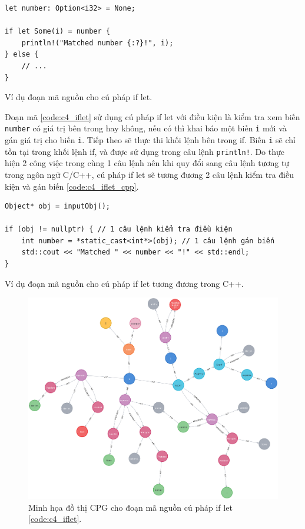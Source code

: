 \begin{listing}[H]
\begin{verbatim}
let number: Option<i32> = None;

if let Some(i) = number {
    println!("Matched number {:?}!", i);
} else {
    // ...
}
\end{verbatim}
\caption{Ví dụ đoạn mã nguồn cho cú pháp if let.}
\label{code:c4_iflet}
\end{listing}

Đoạn mã \ref{code:c4_iflet} sử dụng cú pháp if let với điều kiện là kiểm tra xem biến \texttt{number} có giá trị bên trong hay không, nếu có thì khai báo một biến \texttt{i} mới và gán giá trị cho biến \texttt{i}.
Tiếp theo sẽ thực thi khối lệnh bên trong if.
Biến \texttt{i} sẽ chỉ tồn tại trong khối lệnh if, và được sử dụng trong câu lệnh \texttt{println!}.
Do thực hiện 2 công việc trong cùng 1 câu lệnh nên khi quy đổi sang câu lệnh tương tự trong ngôn ngữ C/C++, cú pháp if let sẽ tương đương 2 câu lệnh kiểm tra điều kiện và gán biến \ref{code:c4_iflet_cpp}.

\begin{listing}[H]
\begin{verbatim}
Object* obj = inputObj();

if (obj != nullptr) { // 1 câu lệnh kiểm tra điều kiện
    int number = *static_cast<int*>(obj); // 1 câu lệnh gán biến
    std::cout << "Matched " << number << "!" << std::endl;
}
\end{verbatim}
\caption{Ví dụ đoạn mã nguồn cho cú pháp if let tương đương trong C++.}
\label{code:c4_iflet_cpp}
\end{listing}

\begin{figure}[H]
\includegraphics[width=1\columnwidth]{figures/c4/c4_iflet.png}
\centering
\caption{Minh họa đồ thị CPG cho đoạn mã nguồn cú pháp if let \ref{code:c4_iflet}.}
\label{img:c4_cpg_iflet}
\end{figure}

